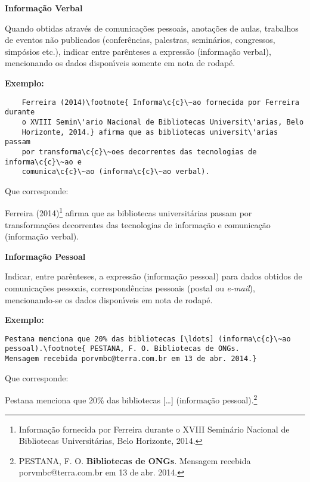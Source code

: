 \textbf{Informa\c{c}\~ao Verbal}

Quando obtidas atrav\'es de comunica\c{c}\~oes pessoais, anota\c{c}\~oes de aulas, trabalhos de eventos n\~ao publicados (confer\^encias, palestras, semin\'arios, congressos, simp\'osios etc.), indicar entre par\^enteses a express\~ao (informa\c{c}\~ao verbal), mencionando os dados dispon\'{\i}veis somente em nota de rodap\'e.

\textbf{Exemplo:}

\begin{alineas}
	\item
	\begin{verbatim}
	Ferreira (2014)\footnote{ Informa\c{c}\~ao fornecida por Ferreira durante 
	o XVIII Semin\'ario Nacional de Bibliotecas Universit\'arias, Belo 
	Horizonte, 2014.} afirma que as bibliotecas universit\'arias passam 
	por transforma\c{c}\~oes decorrentes das tecnologias de informa\c{c}\~ao e 
	comunica\c{c}\~ao (informa\c{c}\~ao verbal).
	\end{verbatim}
\end{alineas}

Que corresponde:

Ferreira (2014)\footnote{ Informa\c{c}\~ao fornecida por Ferreira durante 
o XVIII Semin\'ario Nacional de Bibliotecas Universit\'arias, Belo Horizonte, 
2014.} afirma que as bibliotecas universit\'arias passam por transforma\c{c}\~oes decorrentes das tecnologias de informa\c{c}\~ao e comunica\c{c}\~ao (informa\c{c}\~ao verbal).


\textbf{Informa\c{c}\~ao Pessoal}

Indicar, entre par\^enteses, a express\~ao (informa\c{c}\~ao pessoal) para dados obtidos de comunica\c{c}\~oes pessoais, correspond\^encias pessoais (postal ou \emph{e-mail}), mencionando-se os dados dispon\'{\i}veis em nota de rodap\'e.

\textbf{Exemplo:}


\begin{alineas}
\item
\begin{verbatim}
Pestana menciona que 20% das bibliotecas [\ldots] (informa\c{c}\~ao 
pessoal).\footnote{ PESTANA, F. O. Bibliotecas de ONGs. 
Mensagem recebida porvmbc@terra.com.br em 13 de abr. 2014.}
\end{verbatim}
\end{alineas}


Que corresponde:

Pestana menciona que 20\% das bibliotecas [\ldots] (informa\c{c}\~ao pessoal).\footnote{ PESTANA, F. O. \textbf{Bibliotecas de ONGs}. Mensagem recebida porvmbc@terra.com.br em 13 de abr. 2014.}\\


